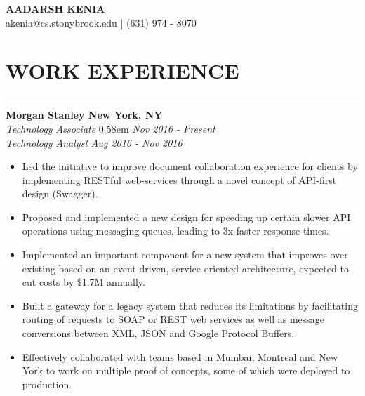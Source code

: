 \documentclass[12pt]{article}
\newcommand{\sectionHeading}[1]{
\vspace{-15pt}
\section*{\small{#1}}
\vspace{-10pt}
\hrule
\vspace{8pt}
}
\newcommand{\experienceSectionSubheading}[6]{
  \vspace{-1pt}
    \small{\textbf{Morgan Stanley \hfill New York, NY}} \\
    \small{\textit{#3} \hfill \spaceskip  0.58em  \relax\textit{#4}} \\
    \small{\textit{#5} \hfill \textit{#6}} \\
    
    \vspace{-20pt}
}
\newcommand{\sectionListStartWiderSpacing}{
    \begin{itemize}[label={\small{\textbullet}}, leftmargin=20pt, itemsep=-2pt] %
}
\newcommand{\sectionListEnd}{\end{itemize} \vspace{-5pt}}
\newcommand{\sectionListItem}[1]{\item \small{#1}}
\begin{document}
\begin{center}
\LARGE{\textbf{AADARSH KENIA}}\\
\vspace{4pt}
\small{akenia@cs.stonybrook.edu} | (631) 974 - 8070 \\
\vspace{-12pt}
\end{center}

\sectionHeading{WORK EXPERIENCE}
\experienceSectionSubheading
{Morgan Stanley}{New York, NY}
{Technology Associate}{Nov 2016 - Present}
{Technology Analyst}{Aug 2016 - Nov 2016}
\sectionListStartWiderSpacing
    \sectionListItem
        Led the initiative to improve document collaboration experience for clients by implementing RESTful web-services through a novel concept of API-first design (Swagger).
        
    \sectionListItem
        Proposed and implemented a new design for speeding up certain slower API operations using messaging queues, leading to 3x faster response times.
    
    \sectionListItem
        Implemented an important component for a new system that improves over existing based on an event-driven, service oriented architecture, expected to cut costs by \$1.7M annually.
    
    \sectionListItem
        Built a gateway for a legacy system that reduces its limitations by facilitating routing of requests to SOAP or REST web services as well as message conversions between XML, JSON and Google Protocol Buffers.
    
    \sectionListItem    
        Effectively collaborated with teams based in Mumbai, Montreal and New York to work on multiple proof of concepts, some of which were deployed to production. 
        
     
    
        
\sectionListEnd
\end{document}
